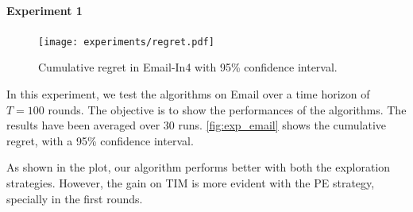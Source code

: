 \begin{example}
\paragraph{Experiment 1}

\begin{figure}[H]
  \centering
  \texttt{[image: experiments/regret.pdf]}
\caption{Cumulative regret in Email-In4 with 95\% confidence interval.}
\label{fig:exp_email}
\end{figure}

In this experiment, we test the algorithms on Email over a time horizon of $T=100$ rounds. The objective is to show the performances of the algorithms. The results have been averaged over 30 runs. \autoref{fig:exp_email} shows the cumulative regret, with a 95\% confidence interval.

As shown in the plot, our algorithm performs better with both the exploration strategies. However, the gain on TIM is more evident with the PE strategy, specially in the first rounds.
\end{example}
\fi
